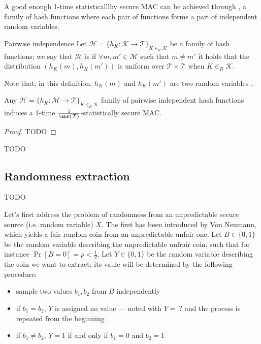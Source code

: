 \documentclass[a4paper, 12pt]{report}
\begin{document}
A good enough 1-time statisticalllhy secure MAC can be achieved through , a family of hash functions where each pair of functions forms a pari of independent random variables.

\begin{frameddefn}{Pairwise independence}
	Let $\mathcal H = \{h_K : \mathcal K \to \mathcal T\}_{K \in_R \mathcal K}$ be a family of hash functions; we say that $\mathcal H$ is  if $\forall m, m' \in \mathcal M$ such that $m \neq m'$ it holds that the distribution $(h_K(m), h_K(m'))$ is uniform over $\mathcal T \times \mathcal T$ when $K \in_R \mathcal K$.
\end{frameddefn}

Note that, in this definition, $h_K(m)$ and $h_K(m')$ are two random variables .

\begin{framedthm}{}
	Any $\mathcal H = \{h_K : \mathcal M \to \mathcal T\}_{K \in_R \mathcal K}$ family of pairwise independent hash functions induces a 1-time $\tfrac{1}{\abs {\mathcal T}}$-statistically secure MAC.
\end{framedthm}

\begin{proof}
	TODO 
\end{proof}

TODO 

\subsection{Randomness extraction}

TODO 

Let's first address the problem of  randomness from an unpredictable secure source (i.e. random variable) $X$. The first  has been introduced by Von Neumann, which yields a fair random coin from an unpredictable unfair one. Let $B \in \{0, 1\}$ be the random variable describing the unpredictable unfrair coin, such that for instance $\Pr[B = 0] = p < \tfrac{1}{2}$. Let $Y \in \{0, 1\}$ be the random variable describing the coin we want to extract; its vaule will be determined by the following procedure:

\begin{itemize}
	\item sample two values $b_1, b_2$ from $B$ independently
	\item if $b_1 = b_2$, $Y$ is assigned no value --- noted with $Y = \ ?$ and the process is repeated from the beginning
	\item if $b_1 \neq b_2$, $Y = 1$ if and only if $b_1 = 0$ and $b_2 = 1$
\end{itemize}
\end{document}
